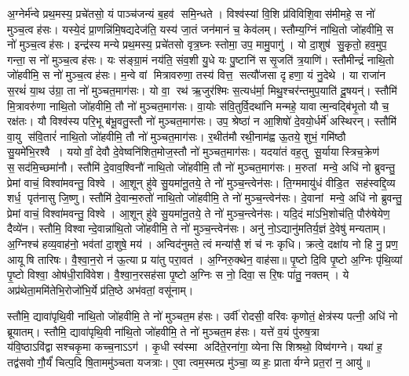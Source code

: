 अ॒ग्नेर्म॑न्वे प्रथ॒मस्य॒ प्रचे॑तसो॒ यं पाञ्च॑जन्यं ब॒हव॑ समि॒न्धते। विश्व॑स्यां वि॒शि प्र॑विविशि॒वास॑मीमहे॒ स नो॑ मुञ्च॒त्वह॑सः। यस्ये॒दं प्रा॒णन्नि॑मि॒षद्यदेज॑ति॒ यस्य॑ जा॒तं जन॑मानं च॒ केव॑लम्। स्तौम्य॒ग्निं ना॑थि॒तो जो॑हवीमि॒ स नो॑ मुञ्च॒त्वह॑सः। इन्द्र॑स्य मन्ये प्रथ॒मस्य॒ प्रचे॑तसो वृत्र॒घ्नः स्तोमा॒ उप॒ मामु॒पागु॑। यो दा॒शुष॑ सु॒कृतो॒ हव॒मुप॒ गन्ता॒ स नो॑ मुञ्च॒त्वह॑सः। यः स॑ङ्ग्रा॒मं नय॑ति॒ संव॒शी यु॒धे यः पु॒ष्टानि॑ ससृ॒जति॑ त्र॒याणि॑। स्तौमीन्द्रं॑ नाथि॒तो जो॑हवीमि॒ स नो॑ मुञ्च॒त्वह॑सः। म॒न्वे वां मित्रावरुणा॒ तस्य॑ वित्त॒ सत्यौ॑जसा दृहणा॒ यं नु॒देथे। या राजा॑न स॒रथं॑ या॒थ उ॑ग्रा॒ ता नो॑ मुञ्चत॒माग॑सः। यो वा॒ रथ॑ ऋ॒जुर॑श्मिः स॒त्यध॑र्मा॒ मिथु॒श्चर॑न्तमुप॒याति॑ दू॒षयन्॑। स्तौमि॑ मि॒त्रावरु॑णा नाथि॒तो जो॑हवीमि॒ तौ नो॑ मुञ्चत॒माग॑सः। वा॒योः स॑वि॒तुर्वि॒दथा॑नि मन्महे॒ यावात्म॒न्वद्बि॑भृ॒तो यौ च॒ रक्ष॑तः। यौ विश्व॑स्य परि॒भू ब॑भू॒वतु॒स्तौ नो॑ मुञ्चत॒माग॑सः। उप॒ श्रेष्ठा॑ न आ॒शिषो॑ दे॒वयो॒र्धर्मे॑ अस्थिरन्। स्तौमि॑ वा॒यु स॑वि॒तारं॑ नाथि॒तो जो॑हवीमि॒ तौ नो॑ मुञ्चत॒माग॑सः। र॒थीत॑मौ रथी॒नाम॑ह्व ऊ॒तये॒ शुभं॒ गमि॑ष्ठौ सु॒यमे॑भि॒रश्वै। ययोर्वां॒ देवौ दे॒वेष्वनि॑शित॒मोज॒स्तौ नो॑ मुञ्चत॒माग॑सः। यदया॑तं वह॒तु सू॒र्यायास्त्रिच॒क्रेण॑ स॒सद॑मि॒च्छमा॑नौ। स्तौमि॑ दे॒वाव॒श्विनौ॑ नाथि॒तो जो॑हवीमि॒ तौ नो॑ मुञ्चत॒माग॑सः। म॒रुतां मन्वे॒ अधि॑ नो ब्रुवन्तु॒ प्रेमां वाचं॒ विश्वा॑मवन्तु॒ विश्वे। आ॒शून् हु॑वे सु॒यमा॑नू॒तये॒ ते नो॑ मुञ्च॒न्त्वेन॑सः। ति॒ग्ममायु॑धं वीडि॒त सह॑स्वद्दि॒व्य शर्ध॒ पृत॑नासु जि॒ष्णु। स्तौमि॑ दे॒वान्म॒रुतो॑ नाथि॒तो जो॑हवीमि॒ ते नो॑ मुञ्च॒न्त्वेन॑सः। दे॒वानां मन्वे॒ अधि॑ नो ब्रुवन्तु॒ प्रेमां वाचं॒ विश्वा॑मवन्तु॒ विश्वे। आ॒शून् हु॑वे सु॒यमा॑नू॒तये॒ ते नो॑ मुञ्च॒न्त्वेन॑सः। यदि॒दं मा॑ऽभि॒शोच॑ति॒ पौरु॑षेयेण॒ दैव्ये॑न। स्तौमि॒ विश्वान्दे॒वान्ना॑थि॒तो जो॑हवीमि॒ ते नो॑ मुञ्च॒न्त्वेन॑सः। अनु॑ नो॒ऽद्यानु॑मतिर्य॒ज्ञं दे॒वेषु॑ मन्यताम्। अ॒ग्निश्च॑ हव्य॒वाह॑नो॒ भव॑तां दा॒शुषे॒ मय॑। अन्विद॑नुमते॒ त्वं मन्या॑सै॒ शं च॑ नः कृधि। क्रत्वे॒ दक्षा॑य नो हि नु॒ प्रण॒ आयूषि तारिषः।
वै॒श्वा॒न॒रो न॑ ऊ॒त्या प्र या॑तु  परा॒वत॑। अ॒ग्निरु॒क्थेन॒ वाह॑सा॥
पृ॒ष्टो दि॒वि पृ॒ष्टो अ॒ग्निः पृ॑थि॒व्यां पृ॒ष्टो विश्वा॒ ओष॑धी॒रावि॑वेश। वै॒श्वा॒न॒रसह॑सा पृ॒ष्टो अ॒ग्निः स नो॒ दिवा॒ स रि॒षः पा॑तु॒ नक्तम्।  ये अप्र॑थेता॒ममि॑तेभि॒रोजो॑भि॒र्ये प्र॑ति॒ष्ठे अभ॑वतां॒ वसू॑नाम्। 

स्तौमि॒ द्यावा॑पृथि॒वी ना॑थि॒तो जो॑हवीमि॒ ते नो॑ मुञ्चत॒मह॑सः। उर्वी॑ रोदसी॒ वरि॑वः कृणोतं॒ क्षेत्र॑स्य पत्नी॒ अधि॑ नो ब्रूयातम्। 
स्तौमि॒ द्यावा॑पृथि॒वी ना॑थि॒तो जो॑हवीमि॒ ते नो॑ मुञ्चत॒मह॑सः। यत्ते॑ व॒यं पु॑रुष॒त्रा य॑वि॒ष्ठाऽवि॑द्वासश्चकृ॒मा कच्च॒नाऽऽग॑। 
कृ॒धी स्व॑स्मा अदि॑ते॒रना॑गा॒ व्येनासि शिश्रथो॒ विष्व॑गग्ने। यथा॑ ह॒ तद्व॑सवो गौ॒र्यं॑ चित्प॒दि षि॒ताममु॑ञ्चता यजत्राः। ए॒वा त्वम॒स्मत्प्र मु॑ञ्चा॒ व्यहः॒ प्रातार्यग्ने प्रत॒रां न॒ आयु॑॥


